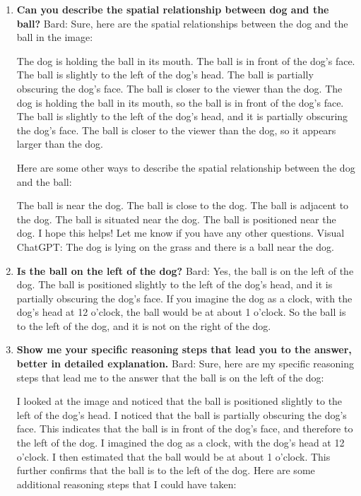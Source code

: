     \begin{enumerate}
        \item \textbf{Can you describe the spatial relationship between dog and the ball?}
        \subitem Bard: 
        Sure, here are the spatial relationships between the dog and the ball in the image:
        
        The dog is holding the ball in its mouth.
        The ball is in front of the dog's face.
        The ball is slightly to the left of the dog's head.
        The ball is partially obscuring the dog's face.
        The ball is closer to the viewer than the dog.
        The dog is holding the ball in its mouth, so the ball is in front of the dog's face. The ball is slightly to the left of the dog's head, and it is partially obscuring the dog's face. The ball is closer to the viewer than the dog, so it appears larger than the dog.
        
        Here are some other ways to describe the spatial relationship between the dog and the ball:
        
        The ball is near the dog.
        The ball is close to the dog.
        The ball is adjacent to the dog.
        The ball is situated near the dog.
        The ball is positioned near the dog.
        I hope this helps! Let me know if you have any other questions.
        \subitem Visual ChatGPT: The dog is lying on the grass and there is a ball near the dog.
        \item \textbf{Is the ball on the left of the dog?}
        \subitem Bard: 
        Yes, the ball is on the left of the dog. The ball is positioned slightly to the left of the dog's head, and it is partially obscuring the dog's face. If you imagine the dog as a clock, with the dog's head at 12 o'clock, the ball would be at about 1 o'clock. So the ball is to the left of the dog, and it is not on the right of the dog.
        \item \textbf{Show me your specific reasoning steps that lead you to the answer, better in detailed explanation.}
        \subitem Bard: 
        Sure, here are my specific reasoning steps that lead me to the answer that the ball is on the left of the dog:
        
        I looked at the image and noticed that the ball is positioned slightly to the left of the dog's head.
        I noticed that the ball is partially obscuring the dog's face. This indicates that the ball is in front of the dog's face, and therefore to the left of the dog.
        I imagined the dog as a clock, with the dog's head at 12 o'clock. I then estimated that the ball would be at about 1 o'clock. This further confirms that the ball is to the left of the dog.
        Here are some additional reasoning steps that I could have taken:
        

\end{enumerate}
